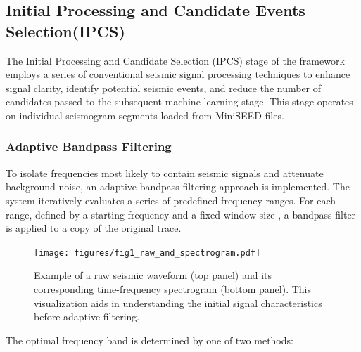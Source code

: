 \documentclass[conference]{IEEEtran}
\begin{document}
    \subsection{Initial Processing and Candidate Events Selection(IPCS)}
    \label{sec:ipcs}
        The Initial Processing and Candidate Selection (IPCS) stage of the framework employs a series of conventional
        seismic signal processing techniques to enhance signal clarity, identify potential seismic events, and reduce
        the number of candidates passed to the subsequent machine learning stage. This stage operates on individual
        seismogram segments loaded from MiniSEED files.
    
        \subsubsection{Adaptive Bandpass Filtering}
            To isolate frequencies most likely to contain seismic signals and attenuate background noise, an adaptive
            bandpass filtering approach is implemented. The system iteratively evaluates a series of predefined
            frequency ranges. For each range, defined by a starting frequency  and a fixed window size , a bandpass
            filter is applied to a copy of the original trace.

            \begin{figure}[htbp]
                \centerline{\texttt{[image: figures/fig1\_raw\_and\_spectrogram.pdf]}}
                \caption{Example of a raw seismic waveform (top panel) and its corresponding time-frequency 
                spectrogram (bottom panel). This visualization aids in understanding the initial signal 
                characteristics before adaptive filtering.}
                \label{fig:raw_spectrogram_example}
            \end{figure}
            
            The optimal frequency band is determined by one of two methods:
            
\end{document}

